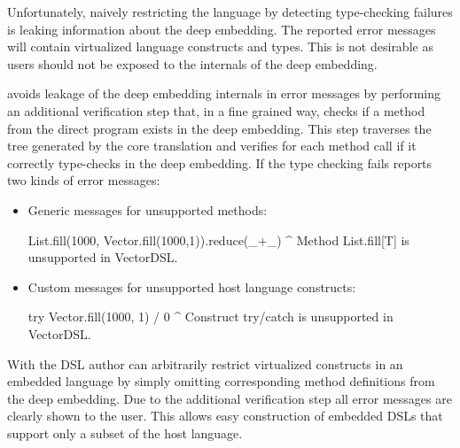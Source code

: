 Unfortunately, naively restricting the language by detecting type-checking
failures is leaking information about the deep embedding. The reported error
messages will contain virtualized language constructs and types. This is not desirable
as users should not be exposed to the internals of the deep embedding.

\yy avoids leakage of the deep embedding internals in error messages by performing an
additional verification step that, in a fine grained way, checks if a method
from the direct program exists in the deep embedding. This step traverses the
tree generated by the core translation and verifies for each method call if it
correctly type-checks in the deep embedding. If the type checking fails \yy
reports two kinds of error messages:

\begin{itemize}
\item Generic messages for unsupported methods:\begin{lstparagraph}
List.fill(1000, Vector.fill(1000,1)).reduce(_+_)
^
Method List.fill[T] is unsupported in VectorDSL.
\end{lstparagraph}

\item Custom messages for unsupported host language constructs:\begin{lstparagraph}
try Vector.fill(1000, 1) / 0
^
Construct try/catch is unsupported in VectorDSL.
\end{lstparagraph}
\end{itemize}
%
With \yy the DSL author can arbitrarily restrict virtualized constructs in an
embedded language by simply omitting corresponding method definitions from the
deep embedding. Due to the additional verification step all error messages are
clearly shown to the user. This allows easy construction of embedded DSLs that
support only a subset of the host language.

